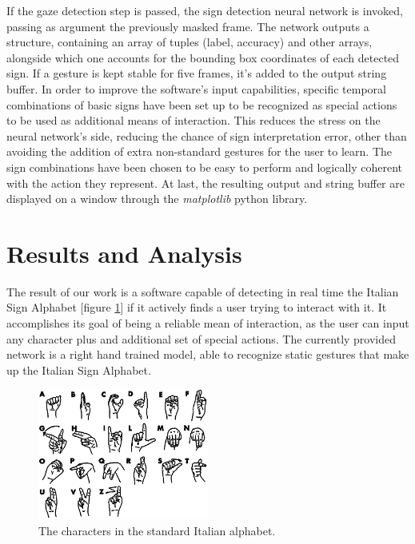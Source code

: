 \documentclass[a4paper, 12pt]{article}
\begin{document}
If the gaze detection step is passed, the sign detection neural network is invoked, passing as argument the previously masked frame. The network outputs a structure, containing an array of tuples (label, accuracy) and other arrays, alongside which one accounts for the bounding box coordinates of each detected sign.\linebreak
If a gesture is kept stable for five frames, it's added to the output string buffer. In order to improve the software's input capabilities, specific temporal combinations of basic signs have been set up to be recognized as special actions to be used as additional means of interaction. This reduces the stress on the neural network's side, reducing the chance of sign interpretation error, other than avoiding the addition of extra non-standard gestures for the user to learn. The sign combinations have been chosen to be easy to perform and logically coherent with the action they represent.\linebreak
At last, the resulting output and string buffer are displayed on a window through the \textit{matplotlib} python library.

\section{Results and Analysis}
\label{ResutsAndAnalysis}
The result of our work is a software capable of detecting in real time the Italian Sign Alphabet [figure \ref{fig:sign}] if it actively finds a user trying to interact with it. It accomplishes its goal of being a reliable mean of interaction, as the user can input any character plus and additional set of special actions.\linebreak
The currently provided network is a right hand trained model, able to recognize static gestures that make up the Italian Sign Alphabet.
\begin{figure}[!h]
    \centering
    \includegraphics[width=0.5\textwidth]{resources/image/sign.png} \caption{The characters in the standard Italian alphabet.} \label{fig:sign}
\end{figure}
\end{document}
